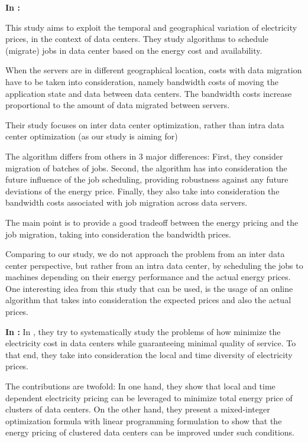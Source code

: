 \textbf{In \cite{MIGRATION_CLOUD}:}

This study aims to exploit the temporal and geographical variation of
electricity prices, in the context of data centers. They study algorithms to
schedule (migrate) jobs in data center based on the energy cost and
availability.

When the servers are in different geographical location, costs with data
migration have to be taken into consideration, namely bandwidth costs of moving
the application state and data between data centers. The bandwidth costs
increase proportional to the amount of data migrated between servers.

Their study focuses on inter data center optimization, rather than intra data
center optimization (as our study is aiming for)

The algorithm differs from others in 3 major differences: First, they consider
migration of batches of jobs. Second, the algorithm has into consideration the
future influence of the job scheduling, providing robustness against any future
deviations of the energy price. Finally, they also take into consideration the 
bandwidth costs associated with job migration across data servers.

The main point is to provide a good tradeoff between the energy pricing and the
job migration, taking into consideration the bandwidth prices.

Comparing to our study, we do not approach the problem from an inter data center
perspective, but rather from an intra data center, by scheduling the jobs to
machines depending on their energy performance and the actual energy prices. One
interesting idea from this study that can be used, is the usage of an online
algorithm that takes into consideration the expected prices and also the actual
prices.


\textbf{In \cite{MINIMIZING_DIST}:}
In \cite{MINIMIZING_DIST}, they try to systematically study the problems of how
minimize the electricity cost in data centers while guaranteeing minimal quality
of service. To that end, they take into consideration the local and time diversity 
of electricity prices.

The contributions are twofold: In one hand, they show that local and time
dependent electricity pricing can be leveraged to minimize total energy price
of clusters of data centers. On the other hand, they present a mixed-integer
optimization formula with linear programming formulation to show that the energy
pricing of clustered data centers can be improved under such conditions.

